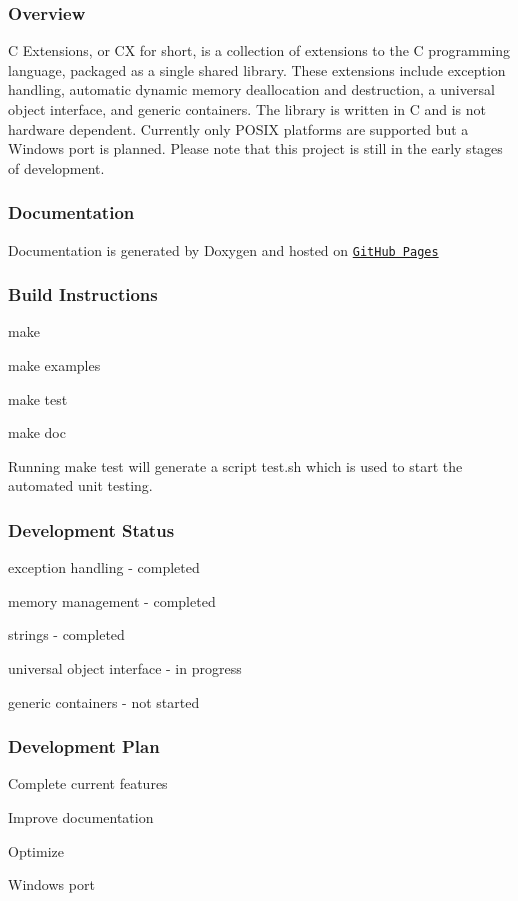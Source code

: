 \subsubsection*{Overview}

C Extensions, or CX for short, is a collection of extensions to the C programming language, packaged as a single shared library. These extensions include exception handling, automatic dynamic memory deallocation and destruction, a universal object interface, and generic containers. The library is written in C and is not hardware dependent. Currently only P\+O\+S\+IX platforms are supported but a Windows port is planned. Please note that this project is still in the early stages of development.

\subsubsection*{Documentation}

Documentation is generated by Doxygen and hosted on \href{https://codrod.github.io/cx/index.html}{\tt Git\+Hub Pages}

\subsubsection*{Build Instructions}


\begin{DoxyItemize}
\item make
\item make examples
\item make test
\item make doc
\end{DoxyItemize}

Running \textquotesingle{}make test\textquotesingle{} will generate a script \textquotesingle{}test.\+sh\textquotesingle{} which is used to start the automated unit testing.

\subsubsection*{Development Status}


\begin{DoxyItemize}
\item exception handling -\/ completed
\item memory management -\/ completed
\item strings -\/ completed
\item universal object interface -\/ in progress
\item generic containers -\/ not started
\end{DoxyItemize}

\subsubsection*{Development Plan}


\begin{DoxyEnumerate}
\item Complete current features
\item Improve documentation
\item Optimize
\item Windows port 
\end{DoxyEnumerate}